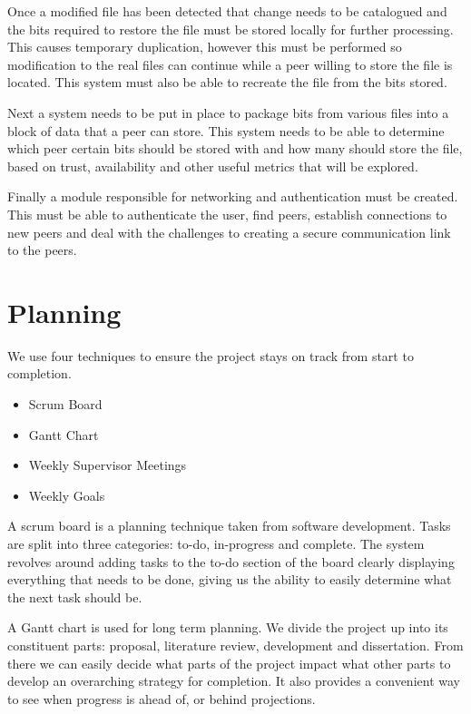 \documentclass[11pt, a4paper, twoside]{report}
\begin{document}
Once a modified file has been detected that change needs to be catalogued and the bits required to restore the file must be stored locally for further processing. This causes temporary duplication, however this must be performed so modification to the real files can continue while a peer willing to store the file is located. This system must also be able to recreate the file from the bits stored.

Next a system needs to be put in place to package bits from various files into a block of data that a peer can store. This system needs to be able to determine which peer certain bits should be stored with and how many should store the file, based on trust, availability and other useful metrics that will be explored.

Finally a module responsible for networking and authentication must be created. This must be able to authenticate the user, find peers, establish connections to new peers and deal with the challenges to creating a secure communication link to the peers.

\section{Planning}

We use four techniques to ensure the project stays on track from start to completion.

\begin{itemize}
 \item Scrum Board
 \item Gantt Chart
 \item Weekly Supervisor Meetings
 \item Weekly Goals
\end{itemize}

A scrum board is a planning technique taken from software development. Tasks are split into three categories: to-do, in-progress and complete. The system revolves around adding tasks to the to-do section of the board clearly displaying everything that needs to be done, giving us the ability to easily determine what the next task should be.

A Gantt chart is used for long term planning. We divide the project up into its constituent parts: proposal, literature review, development and dissertation. From there we can easily decide what parts of the project impact what other parts to develop an overarching strategy for completion. It also provides a convenient way to see when progress is ahead of, or behind projections.
\end{document}

